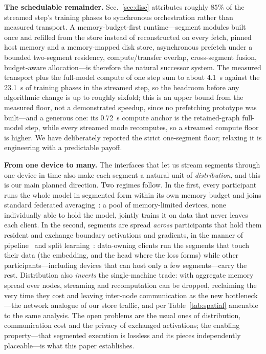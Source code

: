 \documentclass[journal]{IEEEtran}
\begin{document}
\textbf{The schedulable remainder.} Sec.~\ref{sec:disc} attributes roughly
$85\%$ of the streamed step's training phases to synchronous orchestration
rather than measured transport. A memory-budget-first runtime---segment modules built
once and refilled from the store instead of reconstructed on every fetch,
pinned host memory and a memory-mapped
disk store, asynchronous prefetch under a bounded two-segment residency,
compute/transfer overlap, cross-segment fusion, budget-aware
allocation---is therefore the natural successor system. The measured
transport plus the full-model compute of one step sum to about 4.1~s against
the 23.1~s of training phases in the streamed step, so the headroom before any
algorithmic change is up to roughly sixfold; this is an upper bound from the
measured floor, not a demonstrated speedup, since no prefetching prototype was
built---and a generous one: its 0.72~s compute anchor is the retained-graph
full-model step, while every streamed mode recomputes, so a streamed compute
floor is higher. We have deliberately reported the strict
one-segment floor; relaxing it is engineering with a predictable payoff.

\textbf{From one device to many.} The interfaces that let us stream
segments through one device in time also make each segment a natural unit
of \emph{distribution}, and this is our main planned direction. Two
regimes follow. In the first, every participant runs the whole model in
segmented form within its own memory budget and joins standard federated
averaging~\cite{mcmahan2017federated}: a pool of memory-limited devices,
none individually able to hold the model, jointly trains it on data that
never leaves each client. In the second, segments are spread \emph{across}
participants that hold them resident and exchange boundary activations and
gradients, in the manner of pipeline~\cite{huang2019gpipe} and split
learning~\cite{vepakomma2018split}: data-owning clients run the segments
that touch their data (the embedding, and the head where the loss forms)
while other participants---including devices that can host only a few
segments---carry the rest. Distribution also \emph{inverts} the
single-machine trade: with aggregate memory spread over nodes, streaming
and recomputation can be dropped, reclaiming the very time they cost and
leaving inter-node communication as the new bottleneck---the network
analogue of our store traffic, and per Table~\ref{tab:spatial} amenable to
the same analysis. The open problems are the usual ones of distribution,
communication cost and the privacy of exchanged activations; the enabling
property---that segmented execution is lossless and its pieces
independently placeable---is what this paper establishes.
\end{document}
